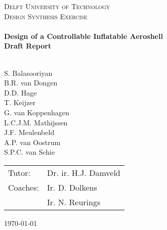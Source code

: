 \begin{titlepage}
\begin{center}
\AddToShipoutPicture*{\BackgroundPic}
\color{white}
\textsc{\LARGE Delft University of Technology}\\[0.3cm]
\textsc{\Large Design Synthesis Exercise}\\[0.5cm]

\vspace{5cm}
\HRule \\[0.4cm]
{\Large \bfseries Design of a Controllable Inflatable Aeroshell}\\[0.2cm]
{\Huge \bfseries Draft Report}\\[0.2cm]
\HRule \\[0.5cm]


\begin{flushleft}
\vspace{7cm}

S. Balasooriyan \\ B.R. van Dongen \\ D.D. Hage \\ T. Keijzer \\  G. van Koppenhagen \\ L.C.J.M. Mathijssen \\ J.F. Meulenbeld   \\ A.P. van Oostrum \\ S.P.C. van Schie\\
	\enlargethispage{15mm} \vspace{15mm}
	\hspace{-3.5mm}
	\begin{tabular}{l l}
		Tutor: & Dr. ir. H.J. Damveld \\
		Coaches: & Ir. D. Dolkens \\ 
		& Ir. N. Reurings \\
	\end{tabular}
\vfill
\begin{large}\today \end{large}
\end{flushleft}
\end{center}
\end{titlepage}